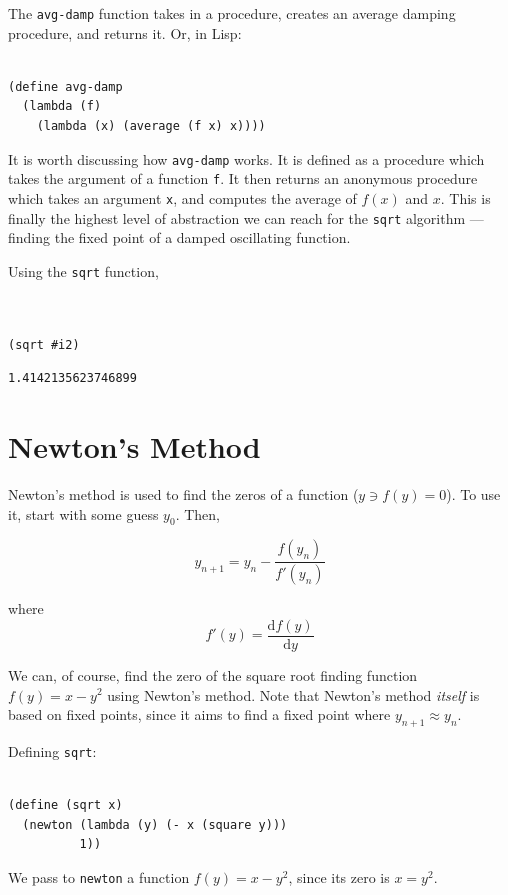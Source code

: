\documentclass[9pt]{report}
\begin{document}
The \texttt{avg-damp} function takes in a procedure, creates an average damping
procedure, and returns it. Or, in Lisp:

\begin{verbatim}

(define avg-damp
  (lambda (f)
    (lambda (x) (average (f x) x))))
\end{verbatim}

It is worth discussing how \texttt{avg-damp} works. It is defined as a
procedure which takes the argument of a function \texttt{f}. It then
returns an anonymous procedure which takes an argument \texttt{x}, and
computes the average of \(f(x)\) and \(x\). This is finally the
highest level of abstraction we can reach for the \texttt{sqrt}
algorithm --- finding the fixed point of a damped oscillating
function.

Using the \texttt{sqrt} function,

\begin{verbatim}


(sqrt #i2)
\end{verbatim}

\begin{verbatim}
1.4142135623746899
\end{verbatim}

\section{Newton's Method}
\label{sec:org3d4a3e4}

Newton's method is used to find the zeros of a function (\(y \ni
   f(y)=0\)). To use it, start with some guess \(y_0\). Then,

$$y_{n+1} = y_n - \frac{f(y_n)}{f'(y_n)}$$

where $$f'(y) = \frac{\mathrm{d}f(y)}{\mathrm{d}y}$$

We can, of course, find the zero of the square root finding function
\(f(y) =  x-y^2\) using Newton's method. Note that Newton's method
\emph{itself} is based on fixed points, since it aims to find a fixed
point where \(y_{n+1}\approx y_n\).

Defining \texttt{sqrt}:

\begin{verbatim}

(define (sqrt x)
  (newton (lambda (y) (- x (square y)))
          1))
\end{verbatim}

We pass to \texttt{newton} a function \(f(y)=x-y^2\), since its zero is \(x=y^2\).
\end{document}
